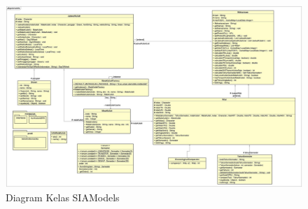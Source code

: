 \begin{figure}[H]
\centering
\includegraphics[scale=0.35]{Gambar/class-diagram-siamodels-new}
\caption{Diagram Kelas SIAModels}
\label{fig:siamodels_class_2018}
\end{figure}